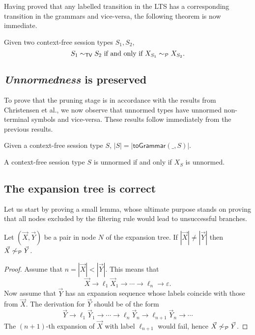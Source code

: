 Having proved that any labelled transition in the LTS has a corresponding
transition in the grammars and vice-versa, the following theorem is now 
immediate.

\begin{theorem}
\label{cfst_vs_grammar}
	Given two context-free session types $S_1, S_2$,
	\[ S_1 \sim_{\mathsf{TV}} S_2 \text{ if and only if } X_{S_1} \sim_{\mathcal{P}} X_{S_2}. \]
\end{theorem}

\subsection{\textit{Unnormedness} is preserved}

To prove that the pruning stage is in accordance with the results 
from Christensen et al., we now observe that unnormed types have 
unnormed non-terminal symbols and vice-versa. These results follow 
immediately from the previous results. 

\begin{corollary}
	Given a context-free session type $S$, $|S| = |\mathsf{toGrammar}(\_,S)|$.
\end{corollary}

\begin{corollary}
	A context-free session type $S$ is unnormed if and only if 
	$X_S$ is unnormed.
\end{corollary}

\subsection{The expansion tree is correct}

Let us start by proving a small lemma, whose ultimate purpose 
stands on proving that all nodes excluded by the filtering rule
would lead to unsuccessful branches.

\begin{lemma}
	Let $(\vec X, \vec Y)$ be a pair in node $N$ of the expansion tree. 
	If $|\vec X| \neq |\vec Y|$ then  $\vec X \not\sim_{\mathcal{P}} \vec Y$.
\end{lemma}

\begin{proof}
	Assume that $n = |\vec X| < |\vec Y|$. This means that 
	\[\vec X \rightarrow \ell_1 \vec X_1 \rightarrow \cdots 
	\rightarrow \ell_n \rightarrow \varepsilon.\]
	Now assume that $\vec Y$ has an expansion sequence whose 
	labels coincide with those from $\vec X$. The derivation for $\vec Y$ 
	should be of the form
	\[\vec Y \rightarrow \ell_1 \vec Y_1 \rightarrow \cdots 
	\rightarrow \ell_n \vec Y_n\rightarrow \ell_{n+1} \vec Y_n \rightarrow \cdots\]
	The $(n+1)$-th expansion of $\vec X$ with label $\ell_{n+1}$ would fail, 
	hence $\vec X \not\sim_{\mathcal{P}} \vec Y$.
\end{proof}

